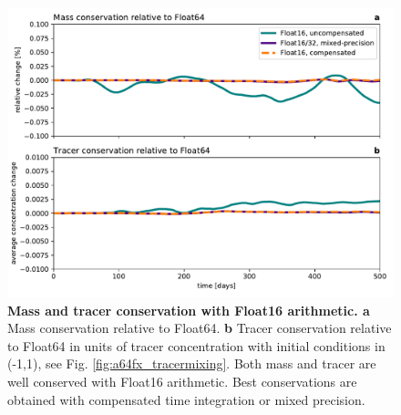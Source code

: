 \begin{figure}[tbhp]
	\includegraphics[width=1\textwidth]{Figures/a64fx/conservation.pdf}
	\caption{\textbf{Mass and tracer conservation with Float16 arithmetic. a}
	Mass conservation relative to Float64. \textbf{b} Tracer conservation relative to Float64 in units of tracer
	concentration with initial conditions in (-1,1), see Fig. \ref{fig:a64fx_tracermixing}. Both mass and tracer
	are well conserved with Float16 arithmetic. Best conservations are obtained with compensated time
	integration or mixed precision.}
	\label{fig:a64fx_conservation}
\end{figure}


